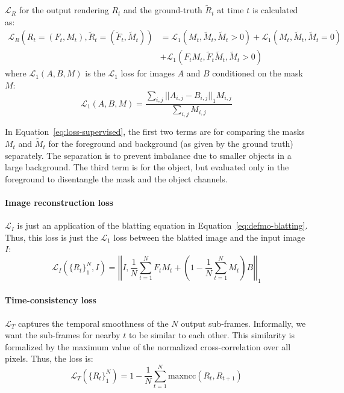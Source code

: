     $\mathcal{L}_R$ for the output rendering $R_t$ and the ground-truth $\tilde{R}_t$ at time $t$ is calculated as:
    \begin{equation}
    \begin{split}
        \mathcal{L}_R(R_t = (F_t, M_t), \tilde{R}_t = (\tilde{F}_t, \tilde{M}_t)) &= \mathcal{L}_1(M_t, \tilde{M}_t, \tilde{M}_t > 0) + \mathcal{L}_1(M_t, \tilde{M}_t, \tilde{M}_t = 0)\\
        &+ \mathcal{L}_1(F_t M_t, \tilde{F}_t \tilde{M}_t, \tilde{M}_t > 0)
    \end{split}%
    \label{eq:loss-supervised}
    \end{equation}
    where $\mathcal{L}_1(A, B, M)$ is the $\mathcal{L}_1$ loss for images $A$ and $B$ conditioned on the mask $M$:
    \begin{equation}
        \mathcal{L}_1(A, B, M) = \frac{\sum_{i, j} {|| A_{i,j} - B_{i,j} ||}_1 M_{i,j}}{\sum_{i,j} M_{i,j}}
    \end{equation}

    In Equation~\ref{eq:loss-supervised}, the first two terms are for comparing the masks $M_t$ and $\tilde{M}_t$ for the foreground and background (as given by the ground truth) separately.
    The separation is to prevent imbalance due to smaller objects in a large background.
    The third term is for the object, but evaluated only in the foreground to disentangle the mask and the object channels.

    \paragraph{Image reconstruction loss}
    $\mathcal{L}_I$ is just an application of the blatting equation in Equation~\ref{eq:defmo-blatting}.
    Thus, this loss is just the $\mathcal{L}_1$ loss between the blatted image and the input image $I$:
    \begin{equation}
        \mathcal{L}_I({\{ R_t \}}_1^N, I) = {\left|\left| I, \frac{1}{N} \sum_{t=1}^N F_t M_t + \left( 1 - \frac{1}{N} \sum_{t=1}^N M_t \right) B \right|\right|}_1
    \end{equation}

    \paragraph{Time-consistency loss}
    $\mathcal{L}_T$ captures the temporal smoothness of the $N$ output sub-frames.
    Informally, we want the sub-frames for nearby $t$ to be similar to each other.
    This similarity is formalized by the maximum value of the normalized cross-correlation over all pixels.
    Thus, the loss is:
    \begin{equation}
        \mathcal{L}_T({\{R_t\}}_1^N) = 1 - \frac{1}{N} \sum_{t=1}^N \mathrm{maxncc}(R_t, R_{t+1})
    \end{equation}

